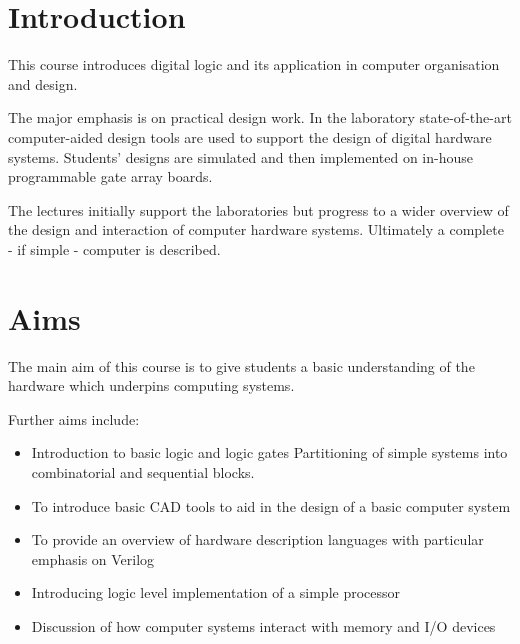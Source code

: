 \section*{Introduction}

This course introduces digital logic and its application in computer organisation and design.

The major emphasis is on practical design work. In the laboratory state-of-the-art computer-aided design tools are used to support the design of digital hardware systems. Students' designs are simulated and then implemented on in-house programmable gate array boards.

The lectures initially support the laboratories but progress to a wider overview of the design and interaction of computer hardware systems. Ultimately a complete - if simple - computer is described.

\section*{Aims}

The main aim of this course is to give students a basic understanding of the hardware which underpins computing systems.

Further aims include:

\begin{itemize}
	\item Introduction to basic logic and logic gates
	Partitioning of simple systems into combinatorial and sequential blocks.
	\item To introduce basic CAD tools to aid in the design of a basic computer system
	\item To provide an overview of hardware description languages with particular emphasis on Verilog
	\item Introducing logic level implementation of a simple processor
	\item Discussion of how computer systems interact with memory and I/O devices
\end{itemize}